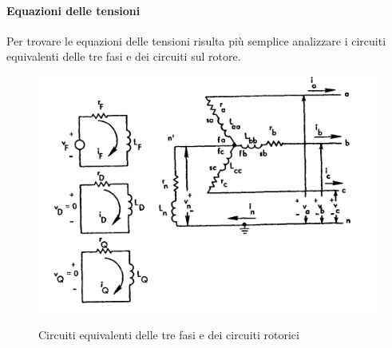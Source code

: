 \documentclass[Lau,noexaminfo]{sapthesis}
\begin{document}
	\paragraph{Equazioni delle tensioni}
	Per trovare le equazioni delle tensioni risulta più semplice analizzare i circuiti equivalenti delle tre fasi e dei circuiti sul rotore.\\
	\begin{figure}
		\centering
		\includegraphics[height=0.3\textheight]{trifase}\\
		\caption{Circuiti equivalenti delle tre fasi e dei circuiti rotorici}
	\end{figure}
	
\end{document}
